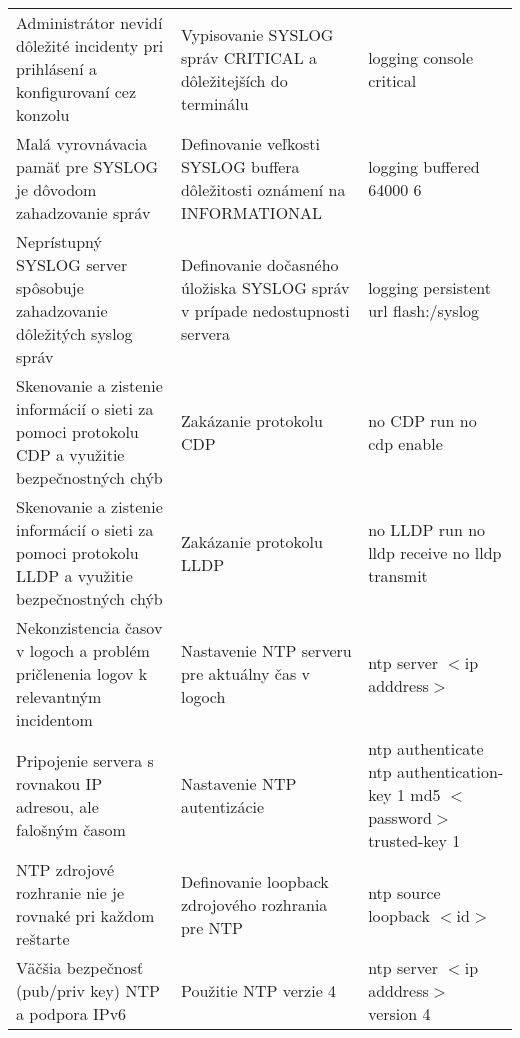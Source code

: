 \begin{longtable}[!htbp]{|L{10em}L{10em}L{34em}|}
	
	
	
	 Administrátor nevidí dôležité incidenty pri prihlásení a konfigurovaní cez konzolu	&Vypisovanie SYSLOG správ CRITICAL a dôležitejších do terminálu	&logging console critical\\




	Malá vyrovnávacia pamäť pre SYSLOG je dôvodom zahadzovanie správ	&Definovanie veľkosti SYSLOG buffera dôležitosti oznámení na INFORMATIONAL	&logging buffered 64000 6\\
	
	
	
	
	 Neprístupný SYSLOG server spôsobuje zahadzovanie dôležitých syslog správ	&Definovanie dočasného úložiska SYSLOG správ v prípade nedostupnosti servera	&logging persistent url flash:/syslog\\
	
	
	
	
	Skenovanie a zistenie informácií o sieti za pomoci protokolu CDP a využitie bezpečnostných chýb	&Zakázanie protokolu CDP	&no CDP run 
	no cdp enable\\
	
	
	
	
	 Skenovanie a zistenie informácií o sieti za pomoci protokolu LLDP a využitie bezpečnostných chýb	&Zakázanie protokolu LLDP	&no LLDP run 
	no lldp receive 
	no lldp transmit\\
	
	
	
	
	Nekonzistencia časov v logoch a problém pričlenenia logov k relevantným incidentom	&Nastavenie NTP serveru pre aktuálny čas v logoch	&ntp server $<$ip adddress$>$\\
	
	
	
	
	 Pripojenie servera s rovnakou IP adresou, ale falošným časom	&Nastavenie NTP autentizácie	&ntp authenticate
	ntp authentication-key 1 md5 $<$password$>$
	trusted-key 1\\
	
	
	
	
	NTP zdrojové rozhranie nie je rovnaké pri každom reštarte	& Definovanie loopback zdrojového rozhrania pre NTP	&ntp source loopback $<$id$>$\\
	
	
	
	
	Väčšia bezpečnosť (pub/priv key) NTP a podpora IPv6	&Použitie NTP verzie 4	&ntp server $<$ip adddress$>$ version 4\\
	

\end{longtable}
